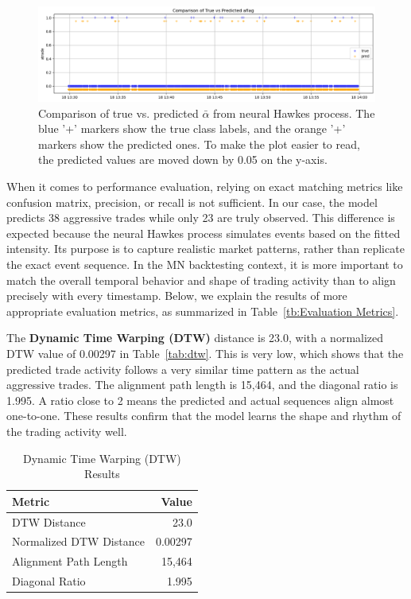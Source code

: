\begin{figure}[H]
    \centering
    \includegraphics[width=0.9\linewidth]{figures/aflag_NHP_181330.png}
    \caption{Comparison of true vs. predicted $\bar{\alpha}$ from neural Hawkes process. 
    The blue '+' markers show the true class labels, and the orange '+' markers show the predicted ones. To make the plot easier to read, the predicted values are moved down by 0.05 on the y-axis.
    }
    \label{fig:nhp-aflag}
\end{figure}

When it comes to performance evaluation, relying on exact matching metrics like confusion matrix, precision, or recall is not sufficient. In our case, the model predicts 38 aggressive trades while only 23 are truly observed. This difference is expected because the neural Hawkes process simulates events based on the fitted intensity. Its purpose is to capture realistic market patterns, rather than replicate the exact event sequence. In the MN backtesting context, it is more important to match the overall temporal behavior and shape of trading activity than to align precisely with every timestamp. Below, we explain the results of more appropriate evaluation metrics, as summarized in Table~\ref{tb:Evaluation Metrics}.


The \textbf{Dynamic Time Warping (DTW)} distance is 23.0, with a normalized DTW value of 0.00297 in Table~\ref{tab:dtw}. This is very low, which shows that the predicted trade activity follows a very similar time pattern as the actual aggressive trades. The alignment path length is 15,464, and the diagonal ratio is 1.995. A ratio close to 2 means the predicted and actual sequences align almost one-to-one. These results confirm that the model learns the shape and rhythm of the trading activity well.
\begin{table}[H]
    \centering
    \caption{Dynamic Time Warping (DTW) Results} \label{tab:dtw}
    \label{tb:dtw-results}
    \begin{tabular}{lr}
    \toprule
    Metric & Value \\
    \midrule
    DTW Distance & 23.0 \\
    Normalized DTW Distance & 0.00297 \\
    Alignment Path Length & 15,464 \\
    Diagonal Ratio & 1.995 \\
    \bottomrule
    \end{tabular}
\end{table}

